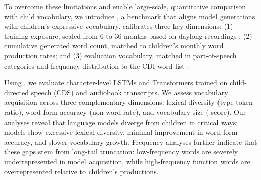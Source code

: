 To overcome these limitations and enable large-scale, quantitative comparison with child vocabulary, we introduce \meCDI{}, a benchmark that aligns model generations with children's expressive vocabulary. \meCDI{} calibrates three key dimensions: (1) training exposure, scaled from 6 to 36 months based on daylong recordings \citep{cristia2019child}; (2) cumulative generated word count, matched to children’s monthly word production rates; and (3) evaluation vocabulary, matched in part-of-speech categories and frequency distribution to the CDI word list \citep{frank2017wordbank}.



Using \meCDI{}, we evaluate character-level LSTMs and Transformers trained on child-directed speech (CDS) and audiobook transcripts.
We assess vocabulary acquisition across three complementary dimensions: lexical diversity (type-token ratio), word form accuracy (non-word rate), and vocabulary size (\meCDI{} score). Our analyses reveal that language models diverge from children in critical ways: models show excessive lexical diversity, minimal improvement in word form accuracy, and slower vocabulary growth. Frequency analyses further indicate that these gaps stem from long-tail truncation: low-frequency words are severely underrepresented in model acquisition, while high-frequency function words are overrepresented relative to children’s productions.





